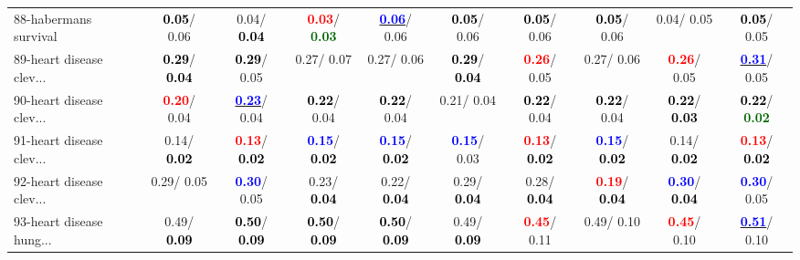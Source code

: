 \begin{table}[h]
\begin{center}
{\begin{tabular}{lc|c|c|c|c|c|c|c|c}
88-habermans survival & \textcolor{black}{\textbf{  0.05}}/  0.06 &   0.04/\textcolor{black}{\textbf{  0.04}} & \textcolor{red}{\textbf{  0.03}}/\textcolor{darkgreen}{\textbf{  0.03}} & \underline{\textcolor{blue}{\textbf{  0.06}}}/  0.06 & \textcolor{black}{\textbf{  0.05}}/  0.06 & \textcolor{black}{\textbf{  0.05}}/  0.06 & \textcolor{black}{\textbf{  0.05}}/  0.06 &   0.04/  0.05 & \textcolor{black}{\textbf{  0.05}}/  0.05 \\
89-heart disease clev... & \textcolor{black}{\textbf{  0.29}}/\textcolor{black}{\textbf{  0.04}} & \textcolor{black}{\textbf{  0.29}}/  0.05 &   0.27/  0.07 &   0.27/  0.06 & \textcolor{black}{\textbf{  0.29}}/\textcolor{black}{\textbf{  0.04}} & \textcolor{red}{\textbf{  0.26}}/  0.05 &   0.27/  0.06 & \textcolor{red}{\textbf{  0.26}}/  0.05 & \underline{\textcolor{blue}{\textbf{  0.31}}}/  0.05 \\
90-heart disease clev... & \textcolor{red}{\textbf{  0.20}}/  0.04 & \underline{\textcolor{blue}{\textbf{  0.23}}}/  0.04 & \textcolor{black}{\textbf{  0.22}}/  0.04 & \textcolor{black}{\textbf{  0.22}}/  0.04 &   0.21/  0.04 & \textcolor{black}{\textbf{  0.22}}/  0.04 & \textcolor{black}{\textbf{  0.22}}/  0.04 & \textcolor{black}{\textbf{  0.22}}/\textcolor{black}{\textbf{  0.03}} & \textcolor{black}{\textbf{  0.22}}/\textcolor{darkgreen}{\textbf{  0.02}} \\
91-heart disease clev... &   0.14/\textcolor{black}{\textbf{  0.02}} & \textcolor{red}{\textbf{  0.13}}/\textcolor{black}{\textbf{  0.02}} & \textcolor{blue}{\textbf{  0.15}}/\textcolor{black}{\textbf{  0.02}} & \textcolor{blue}{\textbf{  0.15}}/\textcolor{black}{\textbf{  0.02}} & \textcolor{blue}{\textbf{  0.15}}/  0.03 & \textcolor{red}{\textbf{  0.13}}/\textcolor{black}{\textbf{  0.02}} & \textcolor{blue}{\textbf{  0.15}}/\textcolor{black}{\textbf{  0.02}} &   0.14/\textcolor{black}{\textbf{  0.02}} & \textcolor{red}{\textbf{  0.13}}/\textcolor{black}{\textbf{  0.02}} \\
92-heart disease clev... &   0.29/  0.05 & \textcolor{blue}{\textbf{  0.30}}/  0.05 &   0.23/\textcolor{black}{\textbf{  0.04}} &   0.22/\textcolor{black}{\textbf{  0.04}} &   0.29/\textcolor{black}{\textbf{  0.04}} &   0.28/\textcolor{black}{\textbf{  0.04}} & \textcolor{red}{\textbf{  0.19}}/\textcolor{black}{\textbf{  0.04}} & \textcolor{blue}{\textbf{  0.30}}/\textcolor{black}{\textbf{  0.04}} & \textcolor{blue}{\textbf{  0.30}}/  0.05 \\ \hline
93-heart disease hung... &   0.49/\textcolor{black}{\textbf{  0.09}} & \textcolor{black}{\textbf{  0.50}}/\textcolor{black}{\textbf{  0.09}} & \textcolor{black}{\textbf{  0.50}}/\textcolor{black}{\textbf{  0.09}} & \textcolor{black}{\textbf{  0.50}}/\textcolor{black}{\textbf{  0.09}} &   0.49/\textcolor{black}{\textbf{  0.09}} & \textcolor{red}{\textbf{  0.45}}/  0.11 &   0.49/  0.10 & \textcolor{red}{\textbf{  0.45}}/  0.10 & \underline{\textcolor{blue}{\textbf{  0.51}}}/  0.10 \\

\end{tabular}}
\end{center}
\end{table}
